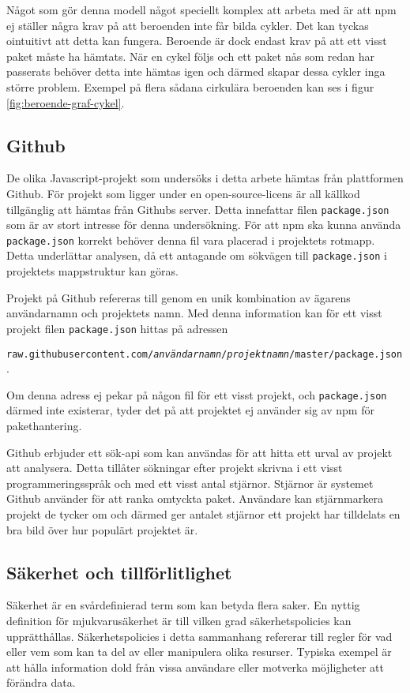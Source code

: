Något som gör denna modell något speciellt komplex att arbeta med är att npm ej ställer några krav på att beroenden inte får bilda cykler. Det kan tyckas ointuitivt att detta kan fungera. Beroende är dock endast krav på att ett visst paket måste ha hämtats. När en cykel följs och ett paket nås som redan har passerats behöver detta inte hämtas igen och därmed skapar dessa cykler inga större problem. Exempel på flera sådana cirkulära beroenden kan ses i figur \ref{fig:beroende-graf-cykel}.

\subsection{Github}
De olika Javascript-projekt som undersöks i detta arbete hämtas från plattformen Github. För projekt som ligger under en open-source-licens är all källkod tillgänglig att hämtas från Githubs server. Detta innefattar filen \texttt{package.json} som är av stort intresse för denna undersökning. För att npm ska kunna använda \texttt{package.json} korrekt behöver denna fil vara placerad i projektets rotmapp. Detta underlättar analysen, då ett antagande om sökvägen till \texttt{package.json} i projektets mappstruktur kan göras.

Projekt på Github refereras till genom en unik kombination av ägarens användarnamn och projektets namn. Med denna information kan för ett visst projekt filen \texttt{package.json} hittas på adressen

\texttt{raw.githubusercontent.com/\textit{användarnamn}/\textit{projektnamn}/master/package.json}.

Om denna adress ej pekar på någon fil för ett visst projekt, och \texttt{package.json} därmed inte existerar, tyder det på att projektet ej använder sig av npm för pakethantering.

Github erbjuder ett sök-api som kan användas för att hitta ett urval av projekt att analysera.\cite{github-api} Detta tillåter sökningar efter projekt skrivna i ett visst programmeringsspråk och med ett visst antal stjärnor. Stjärnor är systemet Github använder för att ranka omtyckta paket. Användare kan stjärnmarkera projekt de tycker om och därmed ger antalet stjärnor ett projekt har tilldelats en bra bild över hur populärt projektet är.

\subsection{Säkerhet och tillförlitlighet}
Säkerhet är en svårdefinierad term som kan betyda flera saker. En nyttig definition för mjukvarusäkerhet är till vilken grad säkerhetspolicies kan upprätthållas. Säkerhetspolicies i detta sammanhang refererar till regler för vad eller vem som kan ta del av eller manipulera olika resurser.\cite{secure-software} Typiska exempel är att hålla information dold från vissa användare eller motverka möjligheter att förändra data.

